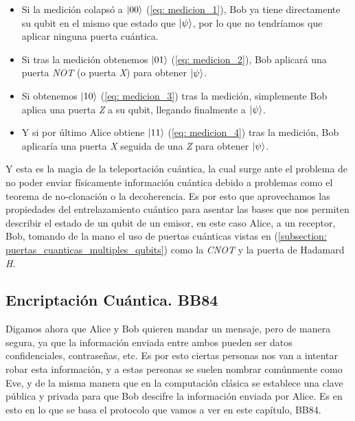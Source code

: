 \documentclass[12pt]{article}
\numberwithin{equation}{section} %
\begin{document}
    \begin{itemize}
        \item Si la medición colapsó a \( \ket{0 0} \) (\ref{eq: medicion_1}), Bob ya tiene directamente su qubit en el mismo que estado que \( \ket{\psi} \), por lo que no tendríamos que aplicar ninguna puerta cuántica.
        \item Si tras la medición obtenemos \( \ket{0 1} \) (\ref{eq: medicion_2}), Bob aplicará una puerta \textit{NOT} (o puerta \textit{X}) para obtener \( \ket{\psi} \).
        \item Si obtenemos \( \ket{1 0} \) (\ref{eq: medicion_3}) tras la medición, simplemente Bob aplica una puerta \textit{Z} a su qubit, llegando finalmente a \( \ket{\psi} \).
        \item Y si por último Alice obtiene \( \ket{1 1} \) (\ref{eq: medicion_4}) tras la medición, Bob aplicaría una puerta \textit{X} seguida de una \textit{Z} para obtener \( \ket{\psi} \).
    \end{itemize}

    \vspace{5mm}

    Y esta es la magia de la teleportación cuántica, la cual surge ante el problema de no poder enviar físicamente información cuántica debido a problemas como el teorema de no-clonación o la decoherencia. Es por esto que aprovechamos las propiedades del entrelazamiento cuántico para asentar las bases que nos permiten describir el estado de un qubit de un emisor, en este caso Alice, a un receptor, Bob, tomando de la mano el uso de puertas cuánticas vistas en (\ref{subsection: puertas_cuanticas_multiples_qubits}) como la \textit{CNOT} y la puerta de Hadamard \textit{H}.

    \vspace{5mm}





    \subsection{Encriptación Cuántica. BB84}

    \vspace{5mm}

    Digamos ahora que Alice y Bob quieren mandar un mensaje, pero de manera segura, ya que la información enviada entre ambos pueden ser datos confidenciales, contraseñas, etc. Es por esto ciertas personas nos van a intentar robar esta información, y a estas personas se suelen nombrar comúnmente como Eve, y de la misma manera que en la computación clásica se establece una clave pública y privada para que Bob descifre la información enviada por Alice. Es en esto en lo que se basa el protocolo que vamos a ver en este capítulo, BB84.
\end{document}

